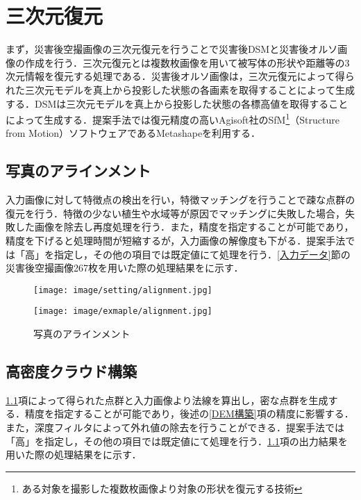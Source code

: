   \section{三次元復元}
    \label{三次元復元}
    まず，災害後空撮画像の三次元復元を行うことで災害後DSMと災害後オルソ画像の作成を行う．三次元復元とは複数枚画像を用いて被写体の形状や距離等の3次元情報を復元する処理である．災害後オルソ画像は，三次元復元によって得られた三次元モデルを真上から投影した状態の各画素を取得することによって生成する．DSMは三次元モデルを真上から投影した状態の各標高値を取得することによって生成する．提案手法では復元精度の高いAgisoft社のSfM\footnote{ある対象を撮影した複数枚画像より対象の形状を復元する技術}（Structure from Motion）ソフトウェアであるMetashape\cite{Metashape}を利用する．


    \subsection{写真のアラインメント}
      \label{写真のアラインメント}
      入力画像に対して特徴点の検出を行い，特徴マッチングを行うことで疎な点群の復元を行う．特徴の少ない植生や水域等が原因でマッチングに失敗した場合，失敗した画像を除去し再度処理を行う．また，精度を指定することが可能であり，精度を下げると処理時間が短縮するが，入力画像の解像度も下がる．提案手法では「高」を指定し，その他の項目では既定値にて処理を行う．\ref{入力データ}節の災害後空撮画像267枚を用いた際の処理結果をに示す．

      \begin{figure}[tbp]
        \begin{minipage}[c]{0.45\hsize}
          \centering
          \texttt{[image: image/setting/alignment.jpg]}
        \end{minipage}
        \begin{minipage}[c]{0.45\hsize}
          \centering
          \texttt{[image: image/exmaple/alignment.jpg]}
        \end{minipage}
        \caption{写真のアラインメント}
        \label{写真のアラインメント結果}
      \end{figure}


    \subsection{高密度クラウド構築}
      \label{高密度クラウド構築}
      \ref{写真のアラインメント}項によって得られた点群と入力画像より法線を算出し，密な点群を生成する．精度を指定することが可能であり，後述の\ref{DEM構築}項の精度に影響する．また，深度フィルタによって外れ値の除去を行うことができる．提案手法では「高」を指定し，その他の項目では既定値にて処理を行う．\ref{写真のアラインメント}項の出力結果を用いた際の処理結果をに示す．

